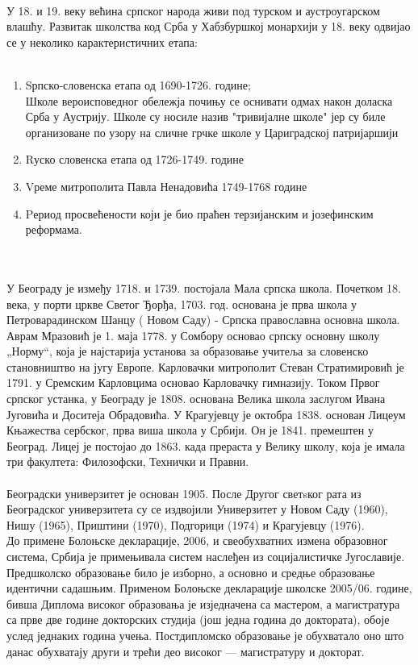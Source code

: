 \documentclass[12pt,twoside]{article}
\begin{document}
  \\У 18. и 19. веку већина српског народа живи под турском и аустроугарском влашћу. Развитак школства код Срба у Хабзбуршкој монархији у 18. веку одвијао се у неколико карактеристичних етапа:\\\\
  \begin{enumerate}
      \item Sрпско-словенска етапа од 1690-1726. године;\\ Школе вероисповедног обележја почињу се оснивати одмах након доласка Срба у Аустрију. Школе су носиле назив "тривијалне школе" јер су биле организоване по узору на сличне грчке школе у Цариградској патријаршији
      \item Rуско словенска етапа од 1726-1749. године
      \item Vреме митрополита Павла Ненадовића 1749-1768 године
      \item Pериод просвећености који је био праћен терзијанским и јозефинским реформама.
  \end{enumerate}
  \\\\
  У Београду је између 1718. и 1739. постојала Мала српска школа. Почетком 18. века, у порти цркве Светог Ђорђа, 1703. год. основана је прва школа у Петроварадинском Шанцу ( Новом Саду) - Српска православна основна школа. Аврам Мразовић је 1. маја 1778. у Сомбору основао српску основну школу „Норму“, која је најстарија установа за образовање учитеља за словенско становништво на југу Европе. Карловачки митрополит Стеван Стратимировић је 1791. у Сремским Карловцима основао Карловачку гимназију. Током Првог српског устанка, у Београду је 1808. основана Велика школа заслугом Ивана Југовића и Доситеја Обрадовића. У Крагујевцу је октобра 1838. основан Лицеум Књажества сербског, прва виша школа у Србији. Он је 1841. премештен у Београд. Лицеј је постојао до 1863. када прераста у Велику школу, која је имала три факултета: Филозофски, Технички и Правни.\\\\Београдски универзитет је основан 1905. После Другог све{т}sког рата из Београдског универзитета су се издвојили Универзитет у Новом Саду (1960), Нишу (1965), Приштини (1970), Подгорици (1974) и Крагујевцу (1976).\\До примене Болоњске декларације, 2006, и свеобухватних измена образовног система, Србија је примењивала систем наслеђен из социјалистичке Југославије. Предшколско образовање било је изборно, а основно и средње образовање идентични садашњим. Применом Болоњске декларације школске 2005/06. године, бивша Диплома високог образовања је изједначена са мастером, а магистратура са прве две године докторских студија (још једна година до доктората), обоје услед једнаких година учења. Постдипломско образовање је обухватало оно што данас обухватају други и трећи део високог — магистратуру и докторат.\\
\end{document}

